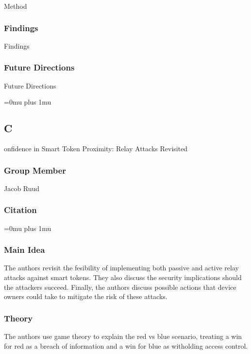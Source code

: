 \noindent
Method

\subsubsection{Findings}

\noindent
Findings

\subsubsection{Future Directions}

\noindent
Future Directions 

\Urlmuskip=0mu plus 1mu\relax

\noindent
\subsection{C}onfidence in {S}mart {T}oken {P}roximity: {R}elay {A}ttacks {R}evisited

\subsubsection{Group Member}

\noindent
Jacob Ruud

\noindent
\subsubsection{Citation}

\Urlmuskip=0mu plus 1mu\relax

\subsubsection{Main Idea}

\noindent
The authors revisit the fesibility of implementing both passive and active relay attacks against smart tokens. They also discuss the security implications should the attackers succeed. Finally, the authors discuss possible actions that device owners could take to mitigate the risk of these attacks.

\subsubsection{Theory}

\noindent
The authors use game theory to explain the red vs blue scenario, treating a win for red as a breach of information and a win for blue as witholding access control.

